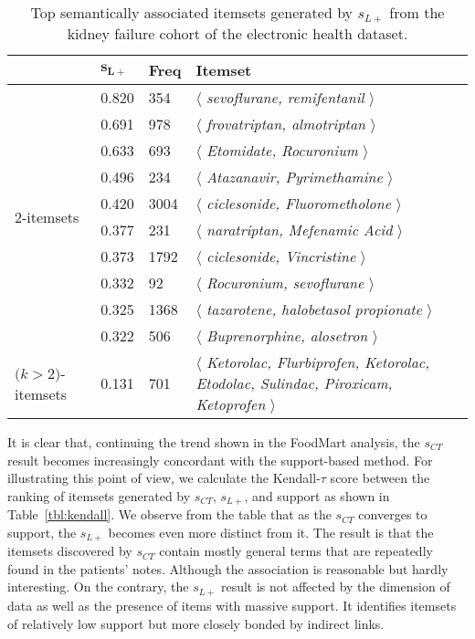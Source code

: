 \begin{table}
\begin{center}
\begin{tabular}{l |l | l | l }
  \hline
&$\mathbf{s_{L+}}$      &\textbf{Freq}&   \textbf{Itemset}\\
  \hline\hline
\multirow{10}{*}{2-itemsets}&	0.820	&	354	&$\langle$\emph{	sevoflurane,	remifentanil	}$\rangle$\\
&	0.691	&	978	&$\langle$\emph{	frovatriptan,	almotriptan	}$\rangle$\\
&	0.633	&	693	&$\langle$\emph{	Etomidate,	Rocuronium	}$\rangle$\\
&	0.496	&	234	&$\langle$\emph{	Atazanavir,	Pyrimethamine	}$\rangle$\\
&	0.420	&	3004	&$\langle$\emph{	ciclesonide,	Fluorometholone	}$\rangle$\\
&	0.377	&	231	&$\langle$\emph{	naratriptan,	Mefenamic Acid	}$\rangle$\\
&	0.373	&	1792	&$\langle$\emph{	ciclesonide,	Vincristine	}$\rangle$\\
&	0.332	&	92	&$\langle$\emph{	Rocuronium,	sevoflurane	}$\rangle$\\
&	0.325	&	1368	&$\langle$\emph{	tazarotene,	halobetasol propionate	}$\rangle$\\
&	0.322	&	506	&$\langle$\emph{	Buprenorphine,	alosetron	}$\rangle$\\
  \hline
\parbox{1cm}{$(k$$>$2$)$-itemsets}&	0.131	&	701	&\parbox{6cm}{$\langle$\emph{	Ketorolac, Flurbiprofen, Ketorolac, Etodolac, Sulindac, Piroxicam, Ketoprofen	}$\rangle$}\\
\hline
\end{tabular}
\end{center}
\caption{\label{tbl:ncbo_lp} Top semantically associated itemsets generated by $s_{L+}$ from the kidney failure cohort of the electronic health dataset.}
\end{table}
It is clear that, continuing the trend shown in the FoodMart analysis, the $s_{CT}$ result becomes increasingly concordant with the support-based method. For illustrating this point of view, we calculate the Kendall-$\tau$ score between the ranking of itemsets generated by $s_{CT}$, $s_{L+}$, and support as shown in Table~\ref{tbl:kendall}. We observe from the table that as the $s_{CT}$ converges to support, the $s_{L+}$ becomes even more distinct from it. The result is that the itemsets discovered by $s_{CT}$ contain mostly general terms that are repeatedly found in the patients' notes. Although the association is reasonable but hardly interesting. On the contrary, the $s_{L+}$ result is not affected by the dimension of data as well as the presence of items with massive support. It identifies itemsets of relatively low support but more closely bonded by indirect links.

